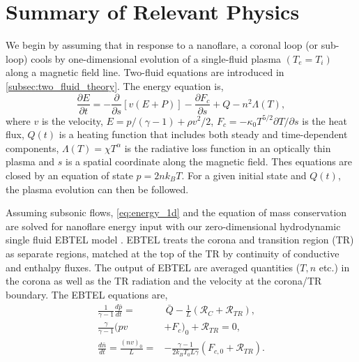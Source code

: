 \documentclass[apj]{emulateapj}
\begin{document}
	\section{Summary of Relevant Physics}
	\label{sec:phys_sum}
	\par We begin by assuming that in response to a nanoflare, a coronal loop (or sub-loop) cools by one-dimensional evolution of a single-fluid plasma $(T_e = T_i)$ along a magnetic field line. Two-fluid equations are introduced in \autoref{subsec:two_fluid_theory}. The energy equation is,
	\begin{equation}
		\label{eq:energy_1d}
		\frac{\partial E}{\partial t} = -\frac{\partial}{\partial s}[v(E+P)] - \frac{\partial F_c}{\partial s} + Q - n^2\Lambda(T),
	\end{equation}
where $v$ is the velocity, $E=p/(\gamma -1) + \rho v^2/2$, $F_c=-\kappa_0 T^{5/2}\partial T/\partial s$ is the heat flux, $Q(t)$ is a heating function that includes both steady and time-dependent components, $\Lambda(T)=\chi T^{\alpha}$ is the radiative loss function in an optically thin plasma \citep[e.g.][]{klimchuk_highly_2008} and $s$ is a spatial coordinate along the magnetic field. Thes equations are closed by an equation of state $p=2nk_BT$. For a given initial state and $Q(t)$, the plasma evolution can then be followed. 
	\par Assuming subsonic flows, \autoref{eq:energy_1d} and the equation of mass conservation are solved for nanoflare energy input with our zero-dimensional hydrodynamic single fluid EBTEL model \citep[see][for derivations]{klimchuk_highly_2008,cargill_enthalpy-based_2012,cargill_enthalpy-based_2012-1,cargill_modelling_2015}. EBTEL treats the corona and transition region (TR) as separate regions, matched at the top of the TR by continuity of conductive and enthalpy fluxes. The output of EBTEL are averaged quantities ($T,n$ etc.) in the corona as well as the TR radiation and the velocity at the corona/TR boundary. The EBTEL equations are,
	\begin{align}
		\frac{1}{\gamma - 1}\frac{d\bar{p}}{dt} =& \,\bar{Q} - \frac{1}{L}(\mathcal{R}_C + \mathcal{R}_{TR}), \label{eq:energy_0d} \\
		\frac{\gamma}{\gamma - 1}(pv& + F_c)_0 + \mathcal{R}_{TR} = 0, \label{eq:tr_energy_0d} \\
		\frac{d\bar{n}}{dt} = \frac{(nv)_0}{L} =& -\frac{\gamma - 1}{2k_BT_0L\gamma}(F_{c,0} + \mathcal{R}_{TR}).\label{eq:mass_0d}
	\end{align}
\end{document}
